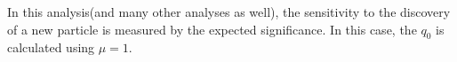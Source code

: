 In this analysis(and many other analyses as well), 
the sensitivity to the discovery of a new particle is 
measured by the expected significance. In this case, the $q_0$ 
is calculated using $\mu = 1$.



